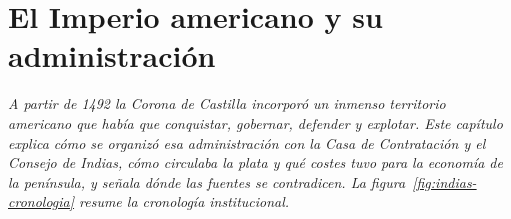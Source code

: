 \documentclass{book}
\begin{document}
\chapter{El Imperio americano y su administración}
\label{chap:hist-04}

\noindent\textit{A partir de 1492 la Corona de Castilla incorporó un inmenso territorio americano que había que conquistar, gobernar, defender y explotar. Este capítulo explica cómo se organizó esa administración con la Casa de Contratación y el Consejo de Indias, cómo circulaba la plata y qué costes tuvo para la economía de la península, y señala dónde las fuentes se contradicen. La figura~\ref{fig:indias-cronologia} resume la cronología institucional.}

\end{document}
